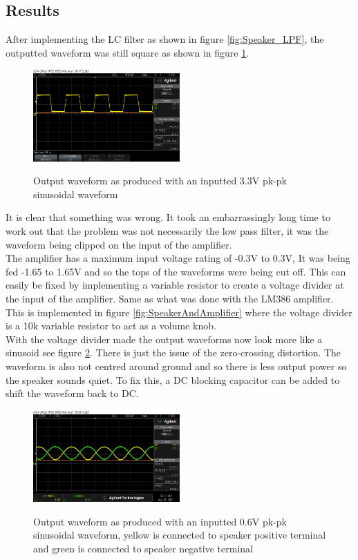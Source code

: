 \documentclass[12pt, a4paper]{article}
\begin{document}
\subsection{Results}
After implementing the LC filter as shown in figure \ref{fig:Speaker_LPF}, the outputted waveform was still square as shown in figure \ref{fig:stillSquare}. 
\begin{figure} [!htb]
	\hfill\includegraphics[width=0.5\textwidth]{./Figures/Waveforms/Output_Class_D_Filtered}\hspace{\fill}
	\label{fig:stillSquare}
	\caption{Output waveform as produced with an inputted 3.3V pk-pk sinusoidal waveform}
\end{figure}
It is clear that something was wrong. It took an embarrassingly long time to work out that the problem was not necessarily the low pass filter, it was the waveform being clipped on the input of the amplifier. \\

The amplifier has a maximum input voltage rating of -0.3V to 0.3V, It was being fed -1.65 to 1.65V and so the tops of the waveforms were being cut off. This can easily be fixed by implementing a variable resistor to create a voltage divider at the input of the amplifier. Same as what was done with the LM386 amplifier. This is implemented in figure \ref{fig:SpeakerAndAmplifier} where the voltage divider is a 10k variable resistor to act as a volume knob. \\

With the voltage divider made the output waveforms now look more like a sinusoid see figure \ref{fig:nowSinusoid}. There is just the issue of the zero-crossing distortion. The waveform is also not centred around ground and so there is less output power so the speaker sounds quiet. To fix this, a DC blocking capacitor can be added to shift the waveform back to DC.


\begin{figure}[!htb]
	\hfill\includegraphics[width=0.5\textwidth]{./Figures/Waveforms/Output_Class_D_Filtered_Reduced_Input (2)}\hspace{\fill}
	\label{fig:nowSinusoid}
	\caption{Output waveform as produced with an inputted 0.6V pk-pk sinusoidal waveform, yellow is connected to speaker positive terminal and green is connected to speaker negative terminal}
\end{figure}
\end{document}
